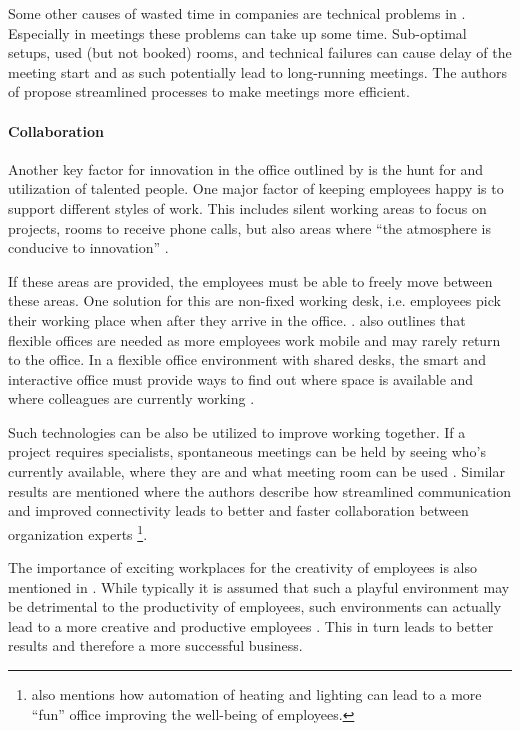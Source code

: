 Some other causes of wasted time in companies are technical problems in \cite{roomzilla3}. 
Especially in meetings these problems can take up some time. Sub-optimal setups, used (but not 
booked) rooms, and technical failures can cause delay of the meeting start and as such potentially 
lead to long-running meetings. The authors of \cite{roomzilla3} propose streamlined processes to 
make meetings more efficient. 

\paragraph{Collaboration}\label{sec:sda-collaboration}
Another key factor for innovation in the office outlined by \cite{hub13} is the hunt for and 
utilization of talented people. One major factor of keeping employees happy is to support different 
styles of work. This includes silent working areas to focus on projects, rooms to receive phone 
calls, but also areas where ``the atmosphere is conducive to innovation'' \cite{tieto}.

If these areas are provided, the employees must be able to freely move between these areas. One 
solution for this are non-fixed working desk, i.e. employees pick their working place when after 
they arrive in the office. \cite{occupiee}.  also outlines that flexible offices are needed as more 
employees work mobile and may rarely return to the office. In a flexible office environment with 
shared desks, the smart and interactive office must provide ways to find out where space is 
available and where colleagues are currently working \cite{tieto}.

Such technologies can be also be utilized to improve working together. If a project requires 
specialists, spontaneous meetings can be held by seeing who's currently available, where they are 
and what meeting room can be used \cite{tieto}. Similar results are mentioned \cite{hbcommunications} 
where the authors describe how streamlined communication and improved connectivity leads to better 
and faster collaboration between organization experts \footnote{\cite{hbcommunications} also 
mentions how automation of heating and lighting can lead to a more ``fun'' office improving the 
well-being of employees.}.

The importance of exciting workplaces for the creativity of employees is also mentioned in 
\cite{roomzilla3}. While typically it is assumed that such a playful environment may be detrimental 
to the productivity of employees, such environments can actually lead to a more creative and 
productive employees \cite{metroffice}. This in turn leads to better results and therefore a more 
successful business.



